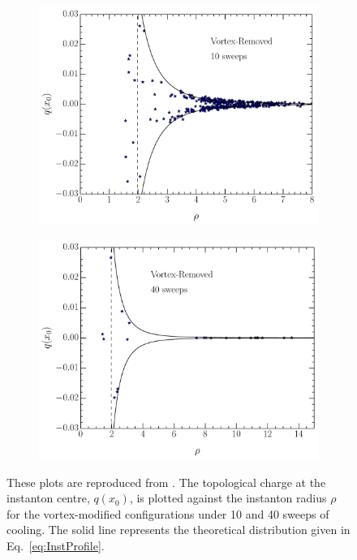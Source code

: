 \begin{figure}
\begin{subfigure}[]{0.5\textwidth}
\includegraphics[width=\columnwidth]{./VRcool10.pdf}
\end{subfigure}
\begin{subfigure}[]{0.5\textwidth}
\label{VRcool40}
\includegraphics[width=\columnwidth]{./VRcool40.pdf}
\end{subfigure}
\caption[The topological charge at the instanton centre plotted against the instanton radius for the cooled vortex-modified configurations.]{\label{fig:InstantonRadius} These plots are reproduced from \citet{Trewartha:2015ida}. The topological charge at the instanton centre, $q(x_0)$, is plotted against the instanton radius $\rho$ for the vortex-modified configurations under 10 and 40 sweeps of cooling. The solid line represents the theoretical distribution given in Eq.~\ref{eq:InstProfile}. }
\end{figure}